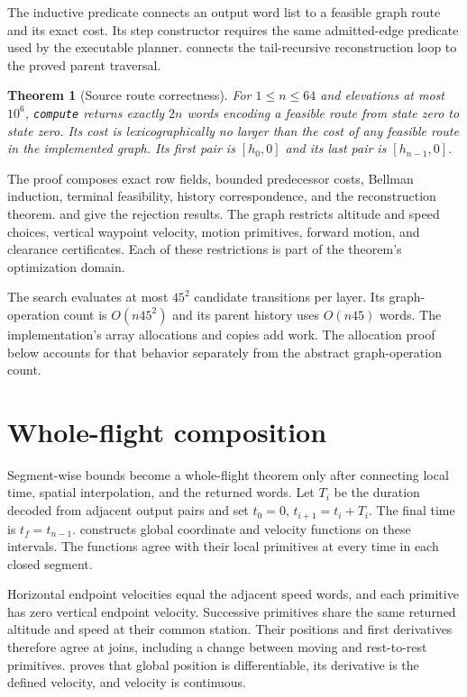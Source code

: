 \documentclass[11pt]{article}
\newtheorem{theorem}{Theorem}
\begin{document}
The inductive predicate  connects an output word list to a feasible graph route and its exact cost.  Its step constructor requires the same admitted-edge predicate used by the executable planner.   connects the tail-recursive reconstruction loop to the proved parent traversal.

\begin{theorem}[Source route correctness]
For $1\leq n\leq64$ and elevations at most $10^6$, \textup{\texttt{compute}} returns exactly $2n$ words encoding a feasible route from state zero to state zero.  Its cost is lexicographically no larger than the cost of any feasible route in the implemented graph.  Its first pair is $[h_0,0]$ and its last pair is $[h_{n-1},0]$.
\end{theorem}

The proof composes exact row fields, bounded predecessor costs, Bellman induction, terminal feasibility, history correspondence, and the reconstruction theorem.   and  give the rejection results.  The graph restricts altitude and speed choices, vertical waypoint velocity, motion primitives, forward motion, and clearance certificates.  Each of these restrictions is part of the theorem's optimization domain.

The search evaluates at most $45^2$ candidate transitions per layer.  Its graph-operation count is $O(n45^2)$ and its parent history uses $O(n45)$ words.  The implementation's array allocations and copies add work.  The allocation proof below accounts for that behavior separately from the abstract graph-operation count.

\section{Whole-flight composition}
\label{sec:flight}

Segment-wise bounds become a whole-flight theorem only after connecting local time, spatial interpolation, and the returned words.  Let $T_i$ be the duration decoded from adjacent output pairs and set $t_0=0$, $t_{i+1}=t_i+T_i$.  The final time is $t_f=t_{n-1}$.   constructs global coordinate and velocity functions on these intervals.  The functions agree with their local primitives at every time in each closed segment.

Horizontal endpoint velocities equal the adjacent speed words, and each primitive has zero vertical endpoint velocity.  Successive primitives share the same returned altitude and speed at their common station.  Their positions and first derivatives therefore agree at joins, including a change between moving and rest-to-rest primitives.   proves that global position is differentiable, its derivative is the defined velocity, and velocity is continuous.
\end{document}
